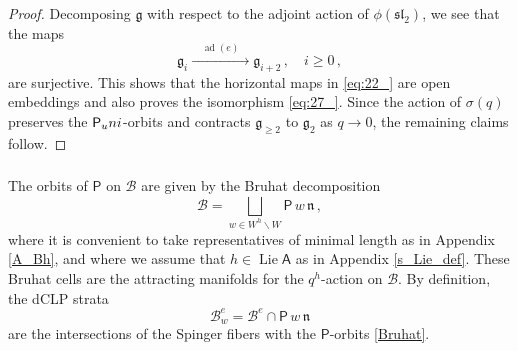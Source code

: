 \documentclass[14pt]{extarticle}
\newcommand{\bA}{\mathsf{A}}
\newcommand{\bG}{\mathsf{G}}
\newcommand{\sP}{\mathsf{P}}
\newcommand{\cB}{\mathscr{B}}
\newcommand{\fg}{\mathfrak{g}}
\newcommand{\fp}{\mathfrak{p}}
\newcommand{\fn}{\mathfrak{n}}
\newcommand{\uni}{\textup{uni}}
\DeclareMathOperator{\Lie}{Lie}
\DeclareMathOperator{\ad}{ad}
\theoremstyle{definition}
\begin{document}
\begin{proof}
  

  Decomposing $\fg$ with respect to the adjoint action of
  $\phi(\mathfrak{sl}_2)$, we see that the maps 
  \[
    \fg_{
    i} \xrightarrow{\quad \ad(e) \quad} \fg_{i+2} \,,
  \quad i  \ge 0 \,,
  \]
  are surjective. This shows that the horizontal maps in \eqref{eq:22_}
  are open embeddings and also proves the isomorphism \eqref{eq:27_}.
  Since the action of $\sigma(q)$ preserves the
  $\sP_\uni$-orbits and contracts $\fg_{\ge 2}$ to $\fg_2$ as
  $q\to 0$, the remaining claims follow. 




\end{proof}








\subsubsection{}

The orbits of $\sP$ on $\cB$ are given by the Bruhat decomposition
%
\begin{equation}
\cB  = \bigsqcup_{w \in W^h\backslash W} \sP\, w \, 
\fn \,,  \label{Bruhat}
\end{equation}
%
where it is convenient to take representatives of minimal length as in
Appendix \ref{A_Bh}, and where we assume that $h\in \Lie \bA$ as
in Appendix \ref{s_Lie_def}.
These Bruhat cells are the attracting manifolds for the $q^h$-action on
$\cB$. By definition, the dCLP strata
%
\begin{equation}
  \label{eq:25}
  \cB^e_w = \cB^e \cap \sP \, w \, \fn 
\end{equation}
%
are the intersections of the Spinger fibers 
with the $\sP$-orbits \eqref{Bruhat}.
\end{document}
